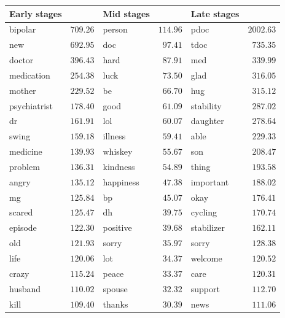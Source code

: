 \renewcommand{\arraystretch}{1}
\begin{table}[p]
    \centering
    \small
    \begin{tabular}{lrlrlr}
     \toprule
    Early stages &        & Mid stages &        & Late stages &         \\
    \midrule
          bipolar & $709.26$ &     person & $114.96$ &        pdoc & $2002.63$ \\
              new & $692.95$ &        doc & $ 97.41$ &        tdoc & $ 735.35$ \\
           doctor & $396.43$ &       hard & $ 87.91$ &         med & $ 339.99$ \\
       medication & $254.38$ &       luck & $ 73.50$ &        glad & $ 316.05$ \\
           mother & $229.52$ &         be & $ 66.70$ &         hug & $ 315.12$ \\
     psychiatrist & $178.40$ &       good & $ 61.09$ &   stability & $ 287.02$ \\
               dr & $161.91$ &        lol & $ 60.07$ &    daughter & $ 278.64$ \\
            swing & $159.18$ &    illness & $ 59.41$ &        able & $ 229.33$ \\
         medicine & $139.93$ &    whiskey & $ 55.67$ &         son & $ 208.47$ \\
          problem & $136.31$ &   kindness & $ 54.89$ &       thing & $ 193.58$ \\
            angry & $135.12$ &  happiness & $ 47.38$ &   important & $ 188.02$ \\
               mg & $125.84$ &         bp & $ 45.07$ &        okay & $ 176.41$ \\
           scared & $125.47$ &         dh & $ 39.75$ &     cycling & $ 170.74$ \\
          episode & $122.30$ &   positive & $ 39.68$ &  stabilizer & $ 162.11$ \\
              old & $121.93$ &      sorry & $ 35.97$ &       sorry & $ 128.38$ \\
             life & $120.06$ &        lot & $ 34.37$ &     welcome & $ 120.52$ \\
            crazy & $115.24$ &      peace & $ 33.37$ &        care & $ 120.31$ \\
          husband & $110.02$ &     spouse & $ 32.32$ &     support & $ 112.70$ \\
             kill & $109.40$ &     thanks & $ 30.39$ &        news & $ 111.06$ \\

\end{tabular}
\end{table}

